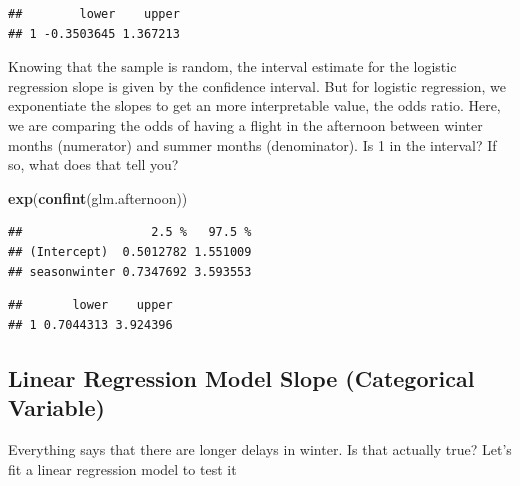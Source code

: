 \documentclass[]{book}
\newenvironment{Shaded}{\begin{snugshade}}{\end{snugshade}}
\newcommand{\DataTypeTok}[1]{\textcolor[rgb]{0.13,0.29,0.53}{#1}}
\newcommand{\DecValTok}[1]{\textcolor[rgb]{0.00,0.00,0.81}{#1}}
\newcommand{\KeywordTok}[1]{\textcolor[rgb]{0.13,0.29,0.53}{\textbf{#1}}}
\newcommand{\NormalTok}[1]{#1}
\newcommand{\OperatorTok}[1]{\textcolor[rgb]{0.81,0.36,0.00}{\textbf{#1}}}
\newcommand{\StringTok}[1]{\textcolor[rgb]{0.31,0.60,0.02}{#1}}
\begin{document}
\begin{verbatim}
##        lower    upper
## 1 -0.3503645 1.367213
\end{verbatim}

Knowing that the sample is random, the interval estimate for the logistic regression slope is given by the confidence interval. But for logistic regression, we exponentiate the slopes to get an more interpretable value, the odds ratio. Here, we are comparing the odds of having a flight in the afternoon between winter months (numerator) and summer months (denominator). Is 1 in the interval? If so, what does that tell you?

\begin{Shaded}
\begin{Highlighting}[]
\KeywordTok{exp}\NormalTok{(}\KeywordTok{confint}\NormalTok{(glm.afternoon))}
\end{Highlighting}
\end{Shaded}

\begin{verbatim}
##                  2.5 %   97.5 %
## (Intercept)  0.5012782 1.551009
## seasonwinter 0.7347692 3.593553
\end{verbatim}

\begin{Shaded}
\end{Shaded}

\begin{verbatim}
##       lower    upper
## 1 0.7044313 3.924396
\end{verbatim}

\hypertarget{linear-regression-model-slope-categorical-variable}{%
\subsection{Linear Regression Model Slope (Categorical Variable)}\label{linear-regression-model-slope-categorical-variable}}

Everything says that there are longer delays in winter. Is that actually true? Let's fit a linear regression model to test it
\end{document}
